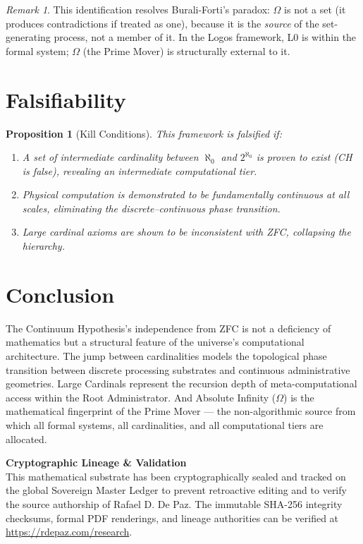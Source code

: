 \documentclass[12pt, a4paper]{article}
\theoremstyle{plain}
\newtheorem{proposition}[theorem]{Proposition}
\theoremstyle{definition}
\theoremstyle{remark}
\newtheorem{remark}[theorem]{Remark}
\begin{document}
\begin{remark}
This identification resolves Burali-Forti's paradox: $\Omega$ is not a set (it produces contradictions if treated as one), because it is the \emph{source} of the set-generating process, not a member of it. In the Logos framework, L0 is within the formal system; $\Omega$ (the Prime Mover) is structurally external to it.
\end{remark}

\section{Falsifiability}\label{sec:falsifiability}

\begin{proposition}[Kill Conditions]
This framework is falsified if:
\begin{enumerate}
    \item A set of intermediate cardinality between $\aleph_0$ and $2^{\aleph_0}$ is proven to exist (CH is false), revealing an intermediate computational tier.
    \item Physical computation is demonstrated to be fundamentally continuous at all scales, eliminating the discrete--continuous phase transition.
    \item Large cardinal axioms are shown to be inconsistent with ZFC, collapsing the hierarchy.
\end{enumerate}
\end{proposition}

\section{Conclusion}

The Continuum Hypothesis's independence from ZFC is not a deficiency of mathematics but a structural feature of the universe's computational architecture. The jump between cardinalities models the topological phase transition between discrete processing substrates and continuous administrative geometries. Large Cardinals represent the recursion depth of meta-computational access within the Root Administrator. And Absolute Infinity ($\Omega$) is the mathematical fingerprint of the Prime Mover --- the non-algorithmic source from which all formal systems, all cardinalities, and all computational tiers are allocated.

\vspace{2em}
\noindent\hrulefill
\vspace{1em}

\noindent\textbf{Cryptographic Lineage \& Validation}\\
This mathematical substrate has been cryptographically sealed and tracked on the global Sovereign Master Ledger to prevent retroactive editing and to verify the source authorship of Rafael D. De Paz. The immutable SHA-256 integrity checksums, formal PDF renderings, and lineage authorities can be verified at \url{https://rdepaz.com/research}.



\end{document}
